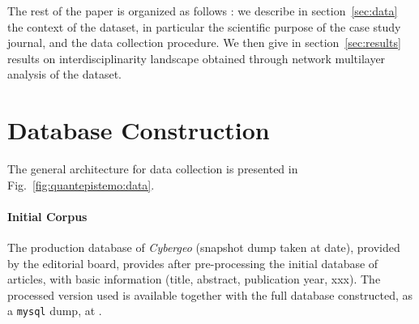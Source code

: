 The rest of the paper is organized as follows : we describe in section~\ref{sec:data} the context of the dataset, in particular the scientific purpose of the case study journal, and the data collection procedure. We then give in section~\ref{sec:results} results on interdisciplinarity landscape obtained through network multilayer analysis of the dataset.










\section*{Database Construction}
\label{sec:data}





The general architecture for data collection is presented in Fig.~\ref{fig:quantepistemo:data}.



\paragraph{Initial Corpus}

The production database of \textit{Cybergeo} (snapshot dump taken at date), provided by the editorial board, provides after pre-processing the initial database of articles, with basic information (title, abstract, publication year, xxx). The processed version used is available together with the full database constructed, as a \texttt{mysql} dump, at \texttt{}.



